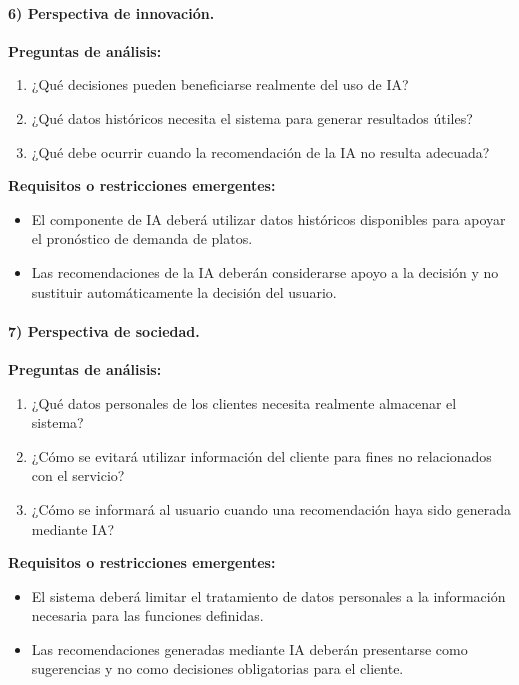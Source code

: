 \paragraph{6) Perspectiva de innovación.}

\textbf{Preguntas de análisis:}
\begin{enumerate}
    \item ¿Qué decisiones pueden beneficiarse realmente del uso de IA?
    \item ¿Qué datos históricos necesita el sistema para generar resultados útiles?
    \item ¿Qué debe ocurrir cuando la recomendación de la IA no resulta adecuada?
\end{enumerate}

\textbf{Requisitos o restricciones emergentes:}
\begin{itemize}
    \item El componente de IA deberá utilizar datos históricos disponibles para
    apoyar el pronóstico de demanda de platos.
    \item Las recomendaciones de la IA deberán considerarse apoyo a la decisión
    y no sustituir automáticamente la decisión del usuario.
\end{itemize}

\paragraph{7) Perspectiva de sociedad.}

\textbf{Preguntas de análisis:}
\begin{enumerate}
    \item ¿Qué datos personales de los clientes necesita realmente almacenar el sistema?
    \item ¿Cómo se evitará utilizar información del cliente para fines no relacionados con el servicio?
    \item ¿Cómo se informará al usuario cuando una recomendación haya sido generada mediante IA?
\end{enumerate}

\textbf{Requisitos o restricciones emergentes:}
\begin{itemize}
    \item El sistema deberá limitar el tratamiento de datos personales a la
    información necesaria para las funciones definidas.
    \item Las recomendaciones generadas mediante IA deberán presentarse como
    sugerencias y no como decisiones obligatorias para el cliente.
\end{itemize}

